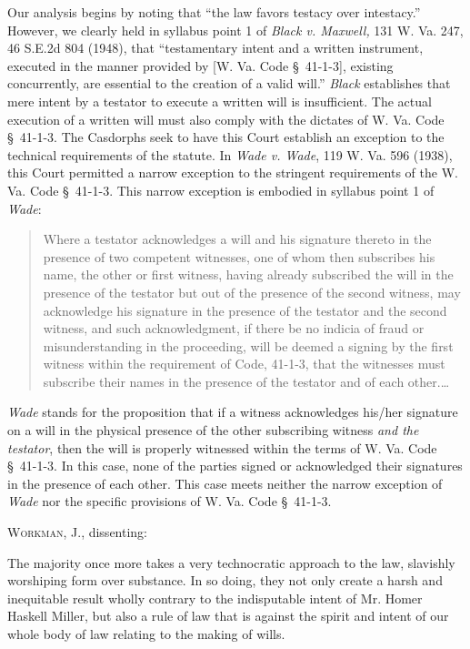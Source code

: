 Our analysis begins by noting that ``the law favors testacy over intestacy.''
However, we clearly held in syllabus point 1 of \textit{Black v. Maxwell, }131
W. Va. 247, 46 S.E.2d 804 (1948), that ``testamentary intent and a written
instrument, executed in the manner provided by [W. Va. Code {\S}~41-1-3],
existing concurrently, are essential to the creation of a valid will.''
\textit{Black} establishes that mere intent by a testator to execute a written
will is insufficient. The actual execution of a written will must also comply
with the dictates of W. Va. Code \S~41-1-3. The Casdorphs seek to have this
Court establish an exception to the technical requirements of the statute. In
\textit{Wade v. Wade}, 119 W. Va. 596 (1938), this Court permitted a narrow
exception to the stringent requirements of the W. Va. Code \S~41-1-3. This
narrow exception is embodied in syllabus point 1 of \textit{Wade}: 
\begin{quote}
Where a testator acknowledges a will and his signature thereto in the presence
of two competent witnesses, one of whom then subscribes his name, the other or
first witness, having already subscribed the will in the presence of the
testator but out of the presence of the second witness, may acknowledge his
signature in the presence of the testator and the second witness, and such
acknowledgment, if there be no indicia of fraud or misunderstanding in the
proceeding, will be deemed a signing by the first witness within the
requirement of Code, 41-1-3, that the witnesses must subscribe their names in
the presence of the testator and of each other.\dots
\end{quote}

\textit{Wade} stands for the proposition that if a witness acknowledges his/her
signature on a will in the physical presence of the other subscribing witness
\textit{and the testator}, then the will is properly witnessed within the terms
of W. Va. Code \S~41-1-3. In this case, none of the parties signed or
acknowledged their signatures in the presence of each other. This case meets
neither the narrow exception of \textit{Wade} nor the specific provisions of
W. Va. Code \S~41-1-3. 

\opinion \textsc{Workman}, J., dissenting: 

The majority once more takes a very technocratic approach to the law, slavishly
worshiping form over substance. In so doing, they not only create a harsh and
inequitable result wholly contrary to the indisputable intent of Mr. Homer
Haskell Miller, but also a rule of law that is against the spirit and intent of
our whole body of law relating to the making of wills. 

